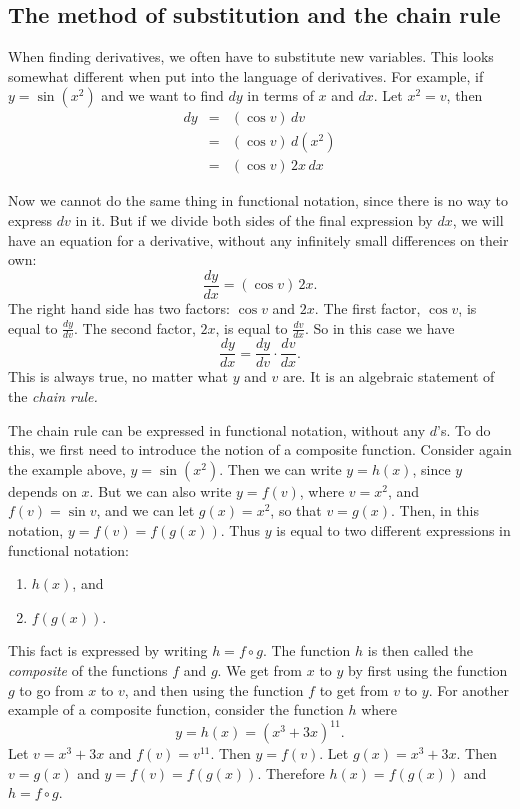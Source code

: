 \documentclass[twoside,openright]{article}
\begin{document}
\subsection*{The method of substitution and the chain rule}\label{chainrulestart}

When finding derivatives, we often have to substitute new variables.
This looks somewhat different when put into the language of
derivatives.  For example, if $y=\sin(x^2)$ and we want to find $dy$
in terms of $x$ and $dx$.  Let $x^2 =v$, then
\begin{eqnarray*}
  dy & = & (\cos v)\,dv\\
     & = & (\cos v)\,d(x^2)\\
     & = & (\cos v)\,2x\,dx
\end{eqnarray*}

Now we cannot do the same thing in functional notation, since there is
no way to express $dv$ in it.  But if we divide both sides of the
final expression by $dx$, we will have an equation for a derivative,
without any infinitely small differences on their own:
$$\frac{dy}{dx} = (\cos v)\,2x.$$
The right hand side has two factors: $\cos v$ and $2x$.  The first
factor, $\cos v$, is equal to $\frac{dy}{dv}$.  The second factor,
$2x$, is equal to $\frac{dv}{dx}$.  So in this case we have
$$\frac{dy}{dx} = \frac{dy}{dv} \cdot \frac{dv}{dx}.$$
This is always true, no matter what $y$ and $v$ are.  It is an
algebraic statement of the {\em chain rule.}  

The chain rule can be
expressed in functional notation, without any $d$'s.  To do this, we first need to introduce the notion of a composite function.  Consider again the example above, $y = \sin(x^2)$. Then we can write $ y = h(x)$, since $y$ depends on $x$.  But we can also write $y=f(v)$, where $v = x^2$, and $f(v) = \sin v$, and we can let $g(x)= x^2$, so that $v = g(x)$.  Then, in this notation, $y = f(v)= f(g(x))$.  Thus $y$ is equal to two different expressions in functional notation:
\begin{enumerate}
\item $h(x)$, and
\item $f(g(x))$.
\end{enumerate}
This fact is expressed by writing $h = f \circ g$.  The function $h$ is then called the {\em composite} of the functions $f$ and $g$.  We get from $x$ to $y$ by first
using the function $g$ to go from $x$ to $v$, and then using the
function $f$ to get from $v$ to $y$.  For another example of a composite function, consider the function $h$ where
$$y = h(x) = (x^3 + 3x)^{11}.$$
Let $v = x^3 + 3x$ and $f(v) = v^{11}$.  Then $y = f(v)$.  Let $g(x) = x^3 + 3x$.  Then $v= g(x)$ and $y = f(v) = f(g(x))$.  Therefore $h(x) = f(g(x))$ and $h = f\circ g$.
\end{document}
